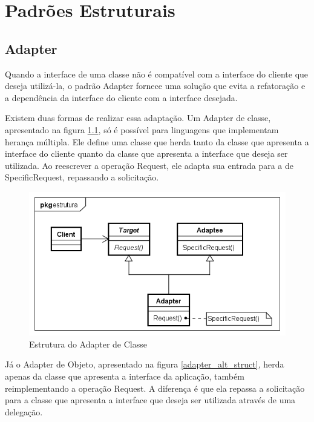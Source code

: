 \chapter{Padrões Estruturais}

\section{Adapter}

Quando a interface de uma classe não 
é compatível com a interface do cliente que deseja 
utilizá-la, o padrão Adapter fornece uma 
solução que evita a refatoração e a dependência da 
interface do cliente com a interface desejada.\cite{gamma:1995}

Existem duas formas de realizar essa adaptação. Um Adapter 
de classe, apresentado na figura \ref{adapter_struct},  
só é possível para linguagens que implementam herança 
múltipla.
Ele define uma classe que herda tanto da classe que 
apresenta a interface do cliente quanto da classe que 
apresenta a interface que deseja ser utilizada. Ao 
reescrever a operação Request, ele adapta sua entrada 
para a de SpecificRequest, repassando a solicitação.\cite{gamma:1995}

\begin{figure}[htb]
	\caption{\label{adapter_struct}Estrutura do Adapter de Classe}
	\begin{center}
	    \includegraphics[scale=0.5]{5_padroes-contexto-funcional/5.2_estruturais/5.2.1_adapter/adapter_classe_estrutura.png}
	\end{center}
\end{figure}

Já o Adapter de Objeto, apresentado na figura \ref{adapter_alt_struct}, 
herda apenas da classe que apresenta a interface 
da aplicação, também reimplementando a operação Request. 
A diferença é que ela repassa a solicitação para a 
classe que apresenta a interface que deseja ser 
utilizada através de uma delegação.\cite{gamma:1995}

